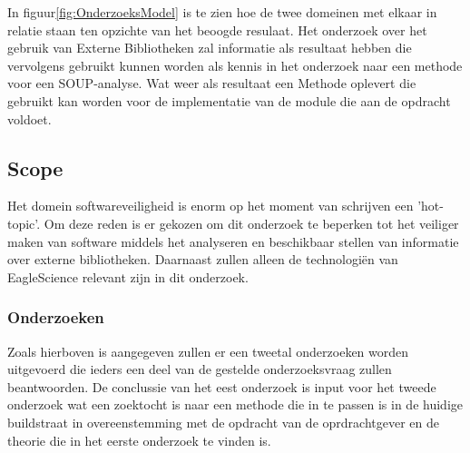 In figuur\ref{fig:OnderzoeksModel} is te zien hoe de twee domeinen met elkaar in relatie staan ten opzichte van het beoogde resulaat. Het onderzoek over het gebruik van Externe Bibliotheken zal informatie als resultaat hebben die vervolgens gebruikt kunnen worden als kennis in het onderzoek naar een methode voor een SOUP-analyse. Wat weer als resultaat een Methode oplevert die gebruikt kan worden voor de implementatie van de module die aan de opdracht voldoet.

\subsection{Scope}\label{subsec:scope}
Het domein softwareveiligheid is enorm op het moment van schrijven een 'hot-topic'. Om deze reden is er gekozen om dit onderzoek te beperken tot het veiliger maken van software middels het analyseren en beschikbaar stellen van informatie over externe bibliotheken. Daarnaast zullen alleen de technologiën van EagleScience relevant zijn in dit onderzoek.

\subsubsection{Onderzoeken}\label{sec:onderzoeken}
Zoals hierboven is aangegeven zullen er een tweetal onderzoeken worden uitgevoerd die ieders een deel van de gestelde onderzoeksvraag zullen beantwoorden. De conclussie van het eest onderzoek is input voor het tweede onderzoek wat een zoektocht is naar een methode die in te passen is in de huidige buildstraat in overeenstemming met de opdracht van de oprdrachtgever en de theorie die in het eerste onderzoek te vinden is.

\newpage %

